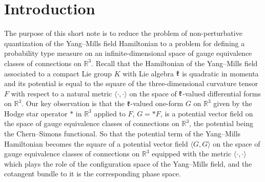 \documentclass{amsart}
\begin{document}
\maketitle

\pagestyle{myheadings}






\section*{Introduction}

\renewcommand{\theequation}{\arabic{equation}}

\setcounter{equation}{0}

The purpose of this short note is to reduce the problem of non-perturbative quantization of the Yang--Mills field Hamiltonian to a problem for defining a probability type measure on an infinite-dimensional space of gauge equivalence classes of connections on $\mathbb{R}^3$. Recall that the Hamiltonian of the Yang--Mills field associated to a compact Lie group $K$ with Lie algebra $\mathfrak k$ is quadratic in momenta and its potential is equal to the square of the three-dimensional curvature tensor $F$ with respect to a natural metric $\langle \cdot,\cdot\rangle $ on the space of $\mathfrak k$-valued differential forms on $\mathbb{R}^3$. Our key observation is that the $\mathfrak k$-valued one-form $G$ on $\mathbb{R}^3$ given by the Hodge star operator $*$ in $\mathbb{R}^3$ applied to $F$, $G=*F$, is a potential vector field on the space of gauge equivalence classes of connections on $\mathbb{R}^3$, the potential being the Chern--Simons functional. So that the potential term of the Yang--Mills Hamiltonian becomes the square of a potential vector field $\langle G,G\rangle $ on the space of gauge equivalence classes of connections on $\mathbb{R}^3$ equipped with the metric $\langle \cdot,\cdot\rangle $ which plays the role of the configuration space of the Yang--Mills field, and the cotangent bundle to it is the corresponding phase space.
\end{document}
